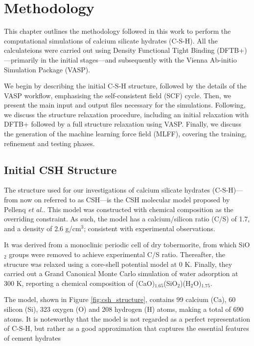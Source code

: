 \chapter{Methodology}
\label{Chapeter3}
This chapter outlines the methodology followed in this work to perform the computational simulations of calcium silicate hydrates (C-S-H). All the calculateions were carried out using Density Functional Tight Binding (DFTB+)---primarily in the initial stages---and subsequently with the Vienna Ab-initio Simulation Package (VASP).

We begin by describing the initial C-S-H structure, followed by the 
details of the VASP workflow, emphasising the self-consistent field (SCF) cycle. Then, we present the main input and output files necessary for the simulations. Following, we discuss the structure relaxation procedure, including an initial relaxation with DFTB+ followed by a full structure relaxation using VASP. Finally, we discuss the generation of the  machine learning force field (MLFF), covering the training, refinement and testing phases. 

\section{Initial CSH Structure}
The structure used for our investigations of calcium silicate hydrates (C-S-H)---from now on referred to as CSH---is the CSH molecular model proposed by Pellenq \emph{et al.}\supercite{Pellenq2009}. This model was constructed with chemical composition as the overriding constraint. As such, the model has a calcium/silicon ratio (C/S) of 1.7, and a density of 2.6 g/cm$^3$; consistent with experimental observations. 

It was derived from a monoclinic periodic cell of dry tobermorite, from which SiO$_2$ groups were removed to achieve experimental C/S ratio. Thereafter, the strucure was relaxed using a core-shell potential model at 0 K. Finally, they carried out a Grand Canonical Monte Carlo simulation of water adsorption at 300 K, reporting a chemical composition of (CaO)$_{1.65}$(SiO$_2$)(H$_2$O)$_{1.75}$. 

The model, shown in Figure \ref{fig:csh_structure}, contains
99 calcium (Ca), 60 silicon (Si), 323 oxygen (O) and 208 hydrogen (H) atoms, making a total of 690 atoms. It is noteworthy that the model is not regarded as a perfect representation of C-S-H, but rather as a good approximation that captures the essential features of cement hydrates

